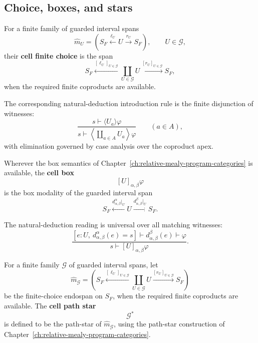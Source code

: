 \subsection{Choice, boxes, and stars}
\label{subsec:cmett-choice-boxes-stars}

\begin{definition}
\label{def:cmett-cell-finite-choice}
    For a finite family of guarded interval spans
    \[
        \widehat m_U =
        \left(
            S_F \xleftarrow{\ell_U} U \xrightarrow{r_U} S_F
        \right),
        \qquad U\in\mathcal G,
    \]
    their \textbf{cell finite choice} is the span
    \[
        S_F
        \xleftarrow{[\ell_U]_{U\in\mathcal G}}
        \coprod_{U\in\mathcal G} U
        \xrightarrow{[r_U]_{U\in\mathcal G}}
        S_F,
    \]
    when the required finite coproducts are available.
\end{definition}

The corresponding natural-deduction introduction rule is the finite disjunction
of witnesses:
\[
\frac{
    s\vdash \langle U_a\rangle\varphi
}{
    s\vdash \left\langle \coprod_{a\in A} U_a \right\rangle\varphi
}
\qquad(a\in A),
\]
with elimination governed by case analysis over the coproduct apex.

\begin{definition}
\label{def:cmett-cell-box}
    Wherever the box semantics of
    Chapter~\ref{ch:relative-mealy-program-categories} is available, the
    \textbf{cell box}
    \[
        [U]_{\alpha,\beta}\varphi
    \]
    is the box modality of the guarded interval span
    \[
        S_F
        \xleftarrow{d_{\alpha,\beta}^{\alpha}|_U}
        U
        \xrightarrow{d_{\alpha,\beta}^{\beta}|_U}
        S_F.
    \]
\end{definition}

The natural-deduction reading is universal over all matching witnesses:
\[
\frac{
    \left[
    e:U,\ 
    d_{\alpha,\beta}^{\alpha}(e)=s
    \right]\vdash
    d_{\alpha,\beta}^{\beta}(e)\vdash\varphi
}{
    s\vdash [U]_{\alpha,\beta}\varphi
}.
\]

\begin{definition}
\label{def:cmett-cell-path-star}
    For a finite family \(\mathcal G\) of guarded interval spans, let
    \[
        \widehat m_{\mathcal G}
        =
        \left(
        S_F
        \xleftarrow{[\ell_U]_{U\in\mathcal G}}
        \coprod_{U\in\mathcal G} U
        \xrightarrow{[r_U]_{U\in\mathcal G}}
        S_F
        \right)
    \]
    be the finite-choice endospan on \(S_F\), when the required finite
    coproducts are available. The \textbf{cell path star}
    \[
        \mathcal G^*
    \]
    is defined to be the path-star of \(\widehat m_{\mathcal G}\), using the
    path-star construction of
    Chapter~\ref{ch:relative-mealy-program-categories}.
\end{definition}

